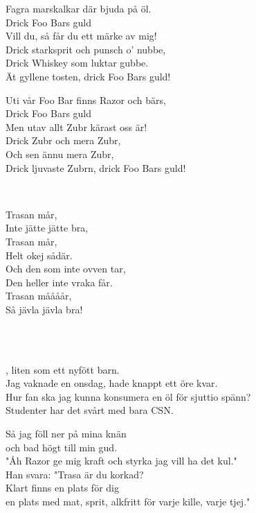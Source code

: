 Fagra marskalkar där bjuda på öl.\\
Drick Foo Bars guld\\
Vill du, så får du ett märke av mig!\\
Drick starksprit och punsch o' nubbe,\\
Drick Whiskey som luktar gubbe.\\
Ät gyllene tosten, drick Foo Bars guld!

Uti vår Foo Bar finns Razor och bärs,\\
Drick Foo Bars guld\\
Men utav allt Zubr kärast oss är!\\
Drick Zubr och mera Zubr,\\
Och sen ännu mera Zubr,\\
Drick ljuvaste Zubrn, drick Foo Bars guld! \\

\newpage


 \\       
\author{Text: Hjärtat}

\songtext{} 
Trasan mår, \\
Inte jätte jätte bra,\\
Trasan mår,\\
Helt okej sådär.\\
Och den som inte ovven tar,\\
Den heller inte vraka får.\\
Trasan måååår,\\
Så jävla jävla bra!

\\


 \\       
\author{Text: Lucifer, Hjärtat och Plinkplonk}

, liten som ett nyfött barn.  \\ 
Jag vaknade en onsdag, hade knappt ett öre kvar. \\ 
Hur fan ska jag kunna konsumera en öl för sjuttio spänn? \\ 
Studenter har det svårt med bara CSN.

Så jag föll ner på mina knän  \\ 
och bad högt till min gud. \\ 
"Åh Razor ge mig kraft och styrka jag vill ha det kul."  \\ 
Han svara: "Trasa är du korkad? \\ 
Klart finns en plats för dig  \\ 
en plats med mat, sprit, alkfritt för varje kille, varje tjej." 


